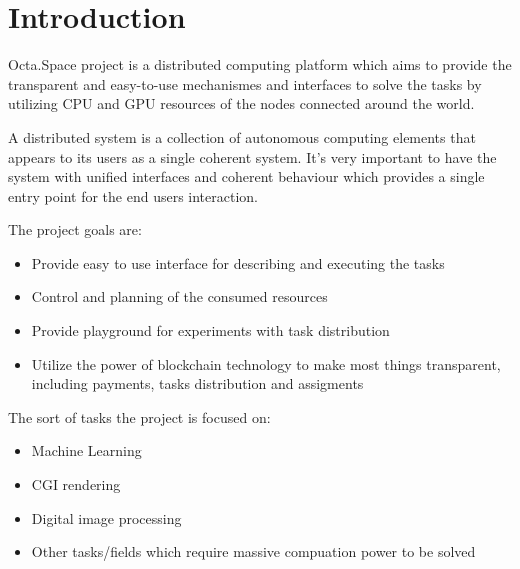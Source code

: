 \section{Introduction}

Octa.Space project is a distributed computing platform which aims to provide the transparent and easy-to-use mechanismes and interfaces
to solve the tasks by utilizing CPU and GPU resources of the nodes connected around the world.

A distributed system is a collection of autonomous computing elements
that appears to its users as a single coherent system.\cite{distributedsystems}
It's very important to have the system with unified interfaces and coherent behaviour which provides a single entry point for the end users interaction.

The project goals are:

\begin{itemize}
    \item Provide easy to use interface for describing and executing the tasks
    \item Control and planning of the consumed resources
    \item Provide playground for experiments with task distribution
    \item Utilize the power of blockchain technology to make most things transparent, including payments, tasks distribution and assigments
\end{itemize}

The sort of tasks the project is focused on:

\begin{itemize}
    \item Machine Learning
    \item CGI rendering
    \item Digital image processing
    \item Other tasks/fields which require massive compuation power to be solved
\end{itemize}
